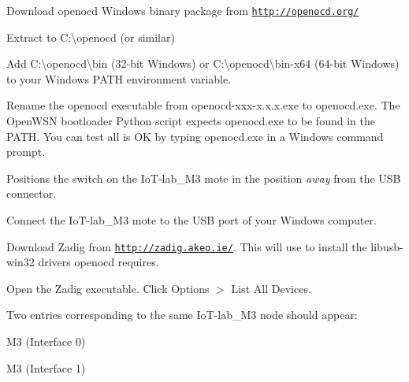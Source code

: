 \begin{DoxyEnumerate}
\item Download {\ttfamily openocd} Windows binary package from \href{http://openocd.org/}{\tt http\+://openocd.\+org/}
\end{DoxyEnumerate}
\begin{DoxyEnumerate}
\item Extract to {\ttfamily C\+:\textbackslash{}openocd} (or similar)
\end{DoxyEnumerate}
\begin{DoxyEnumerate}
\item Add {\ttfamily C\+:\textbackslash{}openocd\textbackslash{}bin} (32-\/bit Windows) or {\ttfamily C\+:\textbackslash{}openocd\textbackslash{}bin-\/x64} (64-\/bit Windows) to your Windows {\ttfamily P\+A\+TH} environment variable.
\end{DoxyEnumerate}
\begin{DoxyEnumerate}
\item Rename the openocd executable from {\ttfamily openocd-\/xxx-\/x.\+x.\+x.\+exe} to {\ttfamily openocd.\+exe}. The Open\+W\+SN bootloader Python script expects {\ttfamily openocd.\+exe} to be found in the {\ttfamily P\+A\+TH}. You can test all is OK by typing {\ttfamily openocd.\+exe} in a Windows command prompt.
\end{DoxyEnumerate}
\begin{DoxyEnumerate}
\item Positions the switch on the Io\+T-\/lab\+\_\+\+M3 mote in the position {\itshape away} from the U\+SB connector.
\end{DoxyEnumerate}
\begin{DoxyEnumerate}
\item Connect the Io\+T-\/lab\+\_\+\+M3 mote to the U\+SB port of your Windows computer.
\end{DoxyEnumerate}
\begin{DoxyEnumerate}
\item Download Zadig from \href{http://zadig.akeo.ie/}{\tt http\+://zadig.\+akeo.\+ie/}. This will use to install the {\ttfamily libusb-\/win32} drivers openocd requires.
\end{DoxyEnumerate}
\begin{DoxyEnumerate}
\item Open the Zadig executable. Click {\ttfamily Options} $>$ {\ttfamily List All Devices}.
\end{DoxyEnumerate}
\begin{DoxyEnumerate}
\item Two entries corresponding to the same {\ttfamily Io\+T-\/lab\+\_\+\+M3} node should appear\+:
\begin{DoxyEnumerate}
\item {\ttfamily M3 (Interface 0)}
\end{DoxyEnumerate}
\begin{DoxyEnumerate}
\item {\ttfamily M3 (Interface 1)}
\end{DoxyEnumerate}
\end{DoxyEnumerate}
